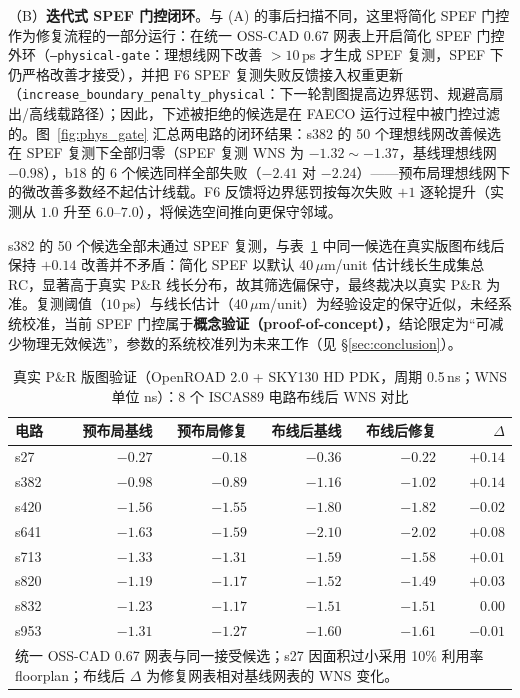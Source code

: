 \documentclass[journal]{IEEEtran}
\begin{document}
（B）\textbf{迭代式 SPEF 门控闭环}。与 (A) 的事后扫描不同，这里将简化 SPEF 门控作为修复流程的一部分运行：在统一 OSS-CAD 0.67 网表上开启简化 SPEF 门控外环（\texttt{--physical-gate}：理想线网下改善 $>10\,$ps 才生成 SPEF 复测，SPEF 下仍严格改善才接受），并把 F6 SPEF 复测失败反馈接入权重更新（\texttt{increase\_boundary\_penalty\_physical}：下一轮割图提高边界惩罚、规避高扇出/高线载路径）；因此，下述被拒绝的候选是在 FAECO 运行过程中被门控过滤的。图~\ref{fig:phys_gate} 汇总两电路的闭环结果：s382 的 50 个理想线网改善候选在 SPEF 复测下全部归零（SPEF 复测 WNS 为 $-1.32\sim-1.37$，基线理想线网 $-0.98$），b18 的 6 个候选同样全部失败（$-2.41$ 对 $-2.24$）——预布局理想线网下的微改善多数经不起估计线载。F6 反馈将边界惩罚按每次失败 $+1$ 逐轮提升（实测从 $1.0$ 升至 $6.0$--$7.0$），将候选空间推向更保守邻域。

s382 的 50 个候选全部未通过 SPEF 复测，与表~\ref{tab:pr8} 中同一候选在真实版图布线后保持 $+0.14$ 改善并不矛盾：简化 SPEF 以默认 40\,$\mu$m/unit 估计线长生成集总 RC，显著高于真实 P\&R 线长分布，故其筛选偏保守，最终裁决以真实 P\&R 为准。复测阈值（$10\,$ps）与线长估计（$40\,\mu$m/unit）为经验设定的保守近似，未经系统校准，当前 SPEF 门控属于\textbf{概念验证（proof-of-concept）}，结论限定为“可减少物理无效候选”，参数的系统校准列为未来工作（见 \S\ref{sec:conclusion}）。

\begin{table}[!t]
\centering
\caption{真实 P\&R 版图验证（OpenROAD 2.0 + SKY130 HD PDK，周期 0.5\,ns；WNS 单位 ns）：8 个 ISCAS89 电路布线后 WNS 对比}
\label{tab:pr8}
\footnotesize
\setlength{\tabcolsep}{2.5pt}
\begin{tabular}{lrrrrr}
\toprule
\textbf{电路} & \textbf{预布局基线} & \textbf{预布局修复} & \textbf{布线后基线} & \textbf{布线后修复} & $\Delta$ \\
\midrule
s27  & $-0.27$ & $-0.18$ & $-0.36$ & $-0.22$ & $+0.14$ \\
s382 & $-0.98$ & $-0.89$ & $-1.16$ & $-1.02$ & $+0.14$ \\
s420 & $-1.56$ & $-1.55$ & $-1.80$ & $-1.82$ & $-0.02$ \\
s641 & $-1.63$ & $-1.59$ & $-2.10$ & $-2.02$ & $+0.08$ \\
s713 & $-1.33$ & $-1.31$ & $-1.59$ & $-1.58$ & $+0.01$ \\
s820 & $-1.19$ & $-1.17$ & $-1.52$ & $-1.49$ & $+0.03$ \\
s832 & $-1.23$ & $-1.17$ & $-1.51$ & $-1.51$ & $0.00$ \\
s953 & $-1.31$ & $-1.27$ & $-1.60$ & $-1.61$ & $-0.01$ \\
\bottomrule
\multicolumn{6}{p{0.92\columnwidth}}{\footnotesize 统一 OSS-CAD 0.67 网表与同一接受候选；s27 因面积过小采用 10\% 利用率 floorplan；布线后 $\Delta$ 为修复网表相对基线网表的 WNS 变化。}\\
\end{tabular}
\end{table}
\end{document}
